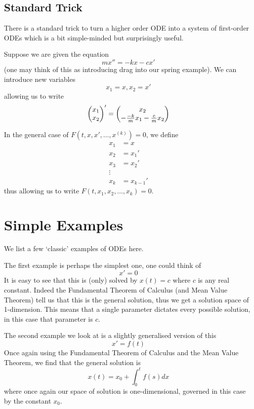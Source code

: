\subsection{Standard Trick}
There is a standard trick to turn a higher order ODE into a system of first-order ODEs which is a bit simple-minded but surprisingly useful.
\begin{example}
Suppose we are given the equation
$$ mx'' = -kx - cx' $$
(one may think of this as introducing drag into our spring example). We can introduce new variables
$$ x_1 = x, x_2 = x' $$
allowing us to write
\begin{align*}
    \begin{pmatrix} x_1\\x_2 \end{pmatrix}' = \begin{pmatrix} x_2\\ -\frac{-k}{m}x_1 - \frac{c}{m}x_2 \end{pmatrix}
\end{align*}
\end{example}
In the general case of $F(t, x, x', \dots, x^{(k)}) = 0$, we define
\begin{align*}
    x_1 &= x\\
    x_2 &= x_1'\\
    x_3 &= x_2'\\
    \vdots\\
    x_k &= x_{k - 1}'
\end{align*}
thus allowing us to write $F(t, x_1, x_2, \dots, x_k) = 0$.

\section{Simple Examples}
We list a few `classic' examples of ODEs here. 

The first example is perhaps the simplest one, one could think of
\begin{equation}
    x' = 0
\end{equation}
It is easy to see that this is (only) solved by $x(t) = c$ where $c$ is any real constant. Indeed the Fundamental Theorem of Calculus (and Mean Value Theorem) tell us that this is the general solution, thus we get a solution space of 1-dimension. This means that a single parameter dictates every possible solution, in this case that parameter is $c$.

The second example we look at is a slightly generalised version of this
\begin{equation}
    x' = f(t)
\end{equation}
Once again using the Fundamental Theorem of Calculus and the Mean Value Theorem, we find that the general solution is
$$ x(t) = x_0 + \int_{0}^{t} f(s) dx $$
where once again our space of solution is one-dimensional, governed in this case by the constant $x_0$.

